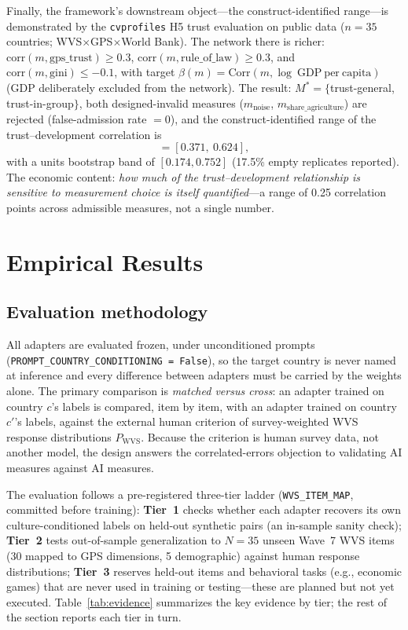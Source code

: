\documentclass[11pt,letterpaper]{article}
\newcommand{\cvp}{\texttt{cvprofiles}}
\begin{document}
Finally, the framework's downstream object---the construct-identified range---is demonstrated by the \cvp{} H5 trust evaluation on public data ($n=35$ countries; WVS$\times$GPS$\times$World Bank). The network there is richer: $\mathrm{corr}(m, \mathrm{gps\_trust}) \ge 0.3$, $\mathrm{corr}(m, \mathrm{rule\_of\_law}) \ge 0.3$, and $\mathrm{corr}(m, \mathrm{gini}) \le -0.1$, with target $\beta(m) = \mathrm{Corr}(m, \log\ \mathrm{GDP\ per\ capita})$ (GDP deliberately excluded from the network). The result: $M^* = \{$trust-general, trust-in-group$\}$, both designed-invalid measures ($m_{\text{noise}}$, $m_{\text{share\_agriculture}}$) are rejected (false-admission rate $=0$), and the construct-identified range of the trust--development correlation is
\begin{equation}
  [L, U] = [0.371,\ 0.624],
\end{equation}
with a units bootstrap band of $[0.174, 0.752]$ (17.5\% empty replicates reported). The economic content: \emph{how much of the trust--development relationship is sensitive to measurement choice is itself quantified}---a range of 0.25 correlation points across admissible measures, not a single number.

\section{Empirical Results}

\subsection{Evaluation methodology}

All adapters are evaluated frozen, under unconditioned prompts (\texttt{PROMPT\_COUNTRY\_CONDITIONING = False}), so the target country is never named at inference and every difference between adapters must be carried by the weights alone. The primary comparison is \emph{matched versus cross}: an adapter trained on country $c$'s labels is compared, item by item, with an adapter trained on country $c'$'s labels, against the external human criterion of survey-weighted WVS response distributions $P_{\mathrm{WVS}}$. Because the criterion is human survey data, not another model, the design answers the correlated-errors objection to validating AI measures against AI measures.

The evaluation follows a pre-registered three-tier ladder (\texttt{WVS\_ITEM\_MAP}, committed before training): \textbf{Tier~1} checks whether each adapter recovers its own culture-conditioned labels on held-out synthetic pairs (an in-sample sanity check); \textbf{Tier~2} tests out-of-sample generalization to $N=35$ unseen Wave~7 WVS items (30 mapped to GPS dimensions, 5 demographic) against human response distributions; \textbf{Tier~3} reserves held-out items and behavioral tasks (e.g., economic games) that are never used in training or testing---these are planned but not yet executed. Table~\ref{tab:evidence} summarizes the key evidence by tier; the rest of the section reports each tier in turn.
\end{document}
